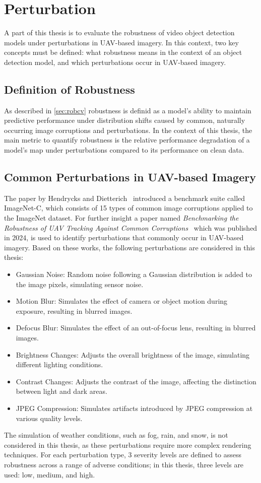 \documentclass[final,twoside]{vutinfth}
\begin{document}
\section{Perturbation}
A part of this thesis is to evaluate the robustness of video object detection models under perturbations in UAV-based imagery.
In this context, two key concepts must be defined: what robustness means in the context of an object detection model, and which perturbations occur in UAV-based imagery.

\subsection{Definition of Robustness}
As described in \ref{sec:robcv} robustness is definid as a model’s ability to maintain predictive performance under distribution shifts caused by common, naturally occurring image corruptions and perturbations.
In the context of this thesis, the main metric to quantify robustness is the relative performance degradation of a model's \gls{map} under perturbations compared to its performance on clean data.
\subsection{Common Perturbations in UAV-based Imagery}
The paper by Hendrycks and Dietterich~\cite{hendrycks2019benchmarking} introduced a benchmark suite called ImageNet-C, which consists of 15 types of common image corruptions applied to the ImageNet dataset.
For further insight a paper named \emph{Benchmarking the Robustness of UAV Tracking Against Common Corruptions}~\cite{liu2024UAVRobustness} which was published in 2024, is used to identify perturbations that commonly occur in UAV-based imagery.
Based on these works, the following perturbations are considered in this thesis:
\begin{itemize}
    \item Gaussian Noise: Random noise following a Gaussian distribution is added to the image pixels, simulating sensor noise.
    \item Motion Blur: Simulates the effect of camera or object motion during exposure, resulting in blurred images.
    \item Defocus Blur: Simulates the effect of an out-of-focus lens, resulting in blurred images.
    \item Brightness Changes: Adjusts the overall brightness of the image, simulating different lighting conditions.
    \item Contrast Changes: Adjusts the contrast of the image, affecting the distinction between light and dark areas.
    \item JPEG Compression: Simulates artifacts introduced by JPEG compression at various quality levels.
\end{itemize}
The simulation of weather conditions, such as fog, rain, and snow, is not considered in this thesis, as these perturbations require more complex rendering techniques.
For each perturbation type, 3 severity levels are defined to assess robustness across a range of adverse conditions; in this thesis, three levels are used: low, medium, and high.
\end{document}
